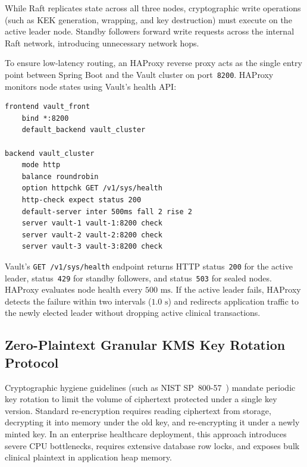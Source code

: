 While Raft replicates state across all three nodes, cryptographic write operations (such as KEK generation, wrapping, and key destruction) must execute on the active leader node. Standby followers forward write requests across the internal Raft network, introducing unnecessary network hops.

To ensure low-latency routing, an HAProxy reverse proxy acts as the single entry point between Spring Boot and the Vault cluster on port~\texttt{8200}. HAProxy monitors node states using Vault's health API:

\begin{lstlisting}[caption={HAProxy active leader routing configuration (\texttt{vault/haproxy.cfg}).}, label={lst:haproxy-cfg}]
frontend vault_front
    bind *:8200
    default_backend vault_cluster

backend vault_cluster
    mode http
    balance roundrobin
    option httpchk GET /v1/sys/health
    http-check expect status 200
    default-server inter 500ms fall 2 rise 2
    server vault-1 vault-1:8200 check
    server vault-2 vault-2:8200 check
    server vault-3 vault-3:8200 check
\end{lstlisting}

Vault's \texttt{GET /v1/sys/health} endpoint returns HTTP status~\texttt{200} for the active leader, status~\texttt{429} for standby followers, and status~\texttt{503} for sealed nodes. HAProxy evaluates node health every $500\text{~ms}$. If the active leader fails, HAProxy detects the failure within two intervals ($1.0\text{~s}$) and redirects application traffic to the newly elected leader without dropping active clinical transactions.

\subsection{Zero-Plaintext Granular KMS Key Rotation Protocol}

Cryptographic hygiene guidelines (such as NIST SP~800-57~\cite{barker_nist_sp800_57}) mandate periodic key rotation to limit the volume of ciphertext protected under a single key version. Standard re-encryption requires reading ciphertext from storage, decrypting it into memory under the old key, and re-encrypting it under a newly minted key. In an enterprise healthcare deployment, this approach introduces severe CPU bottlenecks, requires extensive database row locks, and exposes bulk clinical plaintext in application heap memory.

